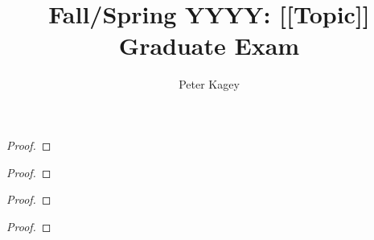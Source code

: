 \documentclass{article}
\newenvironment{problem}[2][Problem]{\begin{trivlist}
\item[\hskip \labelsep {\bfseries #1}\hskip \labelsep {\bfseries #2.}]}{\end{trivlist}}
\begin{document}
\title{Fall/Spring YYYY: [[Topic]] Graduate Exam}
\author{Peter Kagey}

\maketitle

\begin{problem}{1}
\end{problem}

\begin{proof}
\end{proof}

\pagebreak

\begin{problem}{2}
\end{problem}

\begin{proof}
\end{proof}

\pagebreak

\begin{problem}{3}
\end{problem}

\begin{proof}
\end{proof}

\pagebreak

\begin{problem}{4}
\end{problem}

\begin{proof}
\end{proof}
\end{document}

